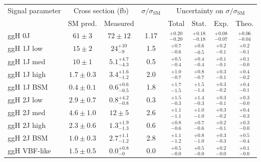 \begin{tabular}{ l | c | c | c | c | c | c | c }
\multirow{2}{*}{Signal parameter} & \multicolumn{2}{c}{Cross section (fb)}  & \multirow{2}{*}{$\sigma/\sigma_{\text{SM}}$}    & \multicolumn{4}{c}{Uncertainty on $\sigma/\sigma_{\text{SM}}$} \\
             & \multicolumn{1}{c}{SM pred.}  & \multicolumn{1}{c}{Measured} &       & Total              & Stat.              & Exp.               & Theo.               \\
\hline
ggH 0J       & $61  \pm 3   $                & $72  \pm 12$                         & 1.17  & $_{-0.20}^{+0.20}$ & $_{-0.18}^{+0.18}$ & $_{-0.07}^{+0.08}$ & $_{-0.04}^{+0.06}$  \\[3pt]
ggH 1J low   & $15  \pm 2   $                & $24  ^{+10}_{-9}$                    & 1.5   & $_{-0.6}^{+0.7}$   & $_{-0.5}^{+0.6}$   & $_{-0.1}^{+0.2}$   & $_{-0.1}^{+0.2}$    \\[3pt]
ggH 1J med   & $10  \pm 1   $                & $5.1 ^{+4.7}_{-4.3}$                 & 0.5   & $_{-0.4}^{+0.5}$   & $_{-0.4}^{+0.4}$   & $_{-0.1}^{+0.1}$   & $_{-0.0}^{+0.1}$    \\[3pt]
ggH 1J high  & $1.7 \pm 0.3 $                & $3.4 ^{+1.6}_{-1.2}$                 & 2.0   & $_{-0.7}^{+1.0}$   & $_{-0.7}^{+0.8}$   & $_{-0.1}^{+0.3}$   & $_{-0.2}^{+0.4}$    \\[3pt]
ggH 1J BSM   & $0.4 \pm 0.1 $                & $0.6 ^{+0.6}_{-0.5}$                 & 1.8   & $_{-1.5}^{+1.7}$   & $_{-1.4}^{+1.5}$   & $_{-0.2}^{+0.3}$   & $_{-0.1}^{+0.4}$    \\[3pt]
ggH 2J low   & $2.9 \pm 0.7 $                & $0.8 ^{+4.2}_{-0.8}$                 & 0.3   & $_{-0.3}^{+1.5}$   & $_{-0.3}^{+1.4}$   & $_{-0.1}^{+0.3}$   & $_{-0.0}^{+0.3}$    \\[3pt]
ggH 2J med   & $4.6 \pm 1.0 $                & $12  \pm 5$                          & 2.6   & $_{-1.1}^{+1.1}$   & $_{-1.0}^{+1.0}$   & $_{-0.2}^{+0.3}$   & $_{-0.3}^{+0.4}$    \\[3pt]
ggH 2J high  & $2.3 \pm 0.6 $                & $1.3 ^{+1.9}_{-1.3}$                 & 0.6   & $_{-0.6}^{+0.8}$   & $_{-0.6}^{+0.7}$   & $_{-0.1}^{+0.2}$   & $_{-0.0}^{+0.3}$    \\[3pt]
ggH 2J BSM   & $1.0 \pm 0.3 $                & $2.7 ^{+1.1}_{-1.2}$                 & 2.8   & $_{-1.2}^{+1.1}$   & $_{-1.0}^{+0.8}$   & $_{-0.3}^{+0.3}$   & $_{-0.4}^{+0.5}$    \\[3pt]
ggH VBF-like & $1.5 \pm 0.5 $                & $0.0 ^{+0.8}_{-0}$                   & 0.0   & $_{-0.0}^{+0.5}$   & $_{-0.0}^{+0.5}$   & $_{-0.0}^{+0.2}$   & $_{-0.0}^{+0.1}$    \\[3pt]

\end{tabular}
